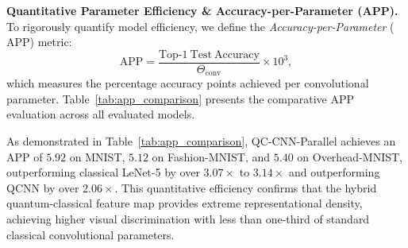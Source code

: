 \documentclass[pdflatex,sn-mathphys-num]{sn-jnl}%
\theoremstyle{thmstyleone}%
\theoremstyle{thmstyletwo}%
\theoremstyle{thmstylethree}%
\begin{document}
\textbf{Quantitative Parameter Efficiency \& Accuracy-per-Parameter (APP).} 
To rigorously quantify model efficiency, we define the \textit{Accuracy-per-Parameter} ($\mathrm{APP}$) metric:
\begin{equation}
\mathrm{APP} = \frac{\mathrm{Top\text{-}1\ Test\ Accuracy}}{\Theta_{\mathrm{conv}}} \times 10^3,
\label{eq:accuracy_per_parameter}
\end{equation}
which measures the percentage accuracy points achieved per convolutional parameter. Table~\ref{tab:app_comparison} presents the comparative APP evaluation across all evaluated models.

\begin{table}[htbp]
\centering
\caption{Accuracy-per-Parameter ($\mathrm{APP}$) Efficiency Metric Across Datasets ($\times 10^3$)}
\label{tab:app_comparison}
\renewcommand{\arraystretch}{1.1}
\end{table}

As demonstrated in Table~\ref{tab:app_comparison}, QC-CNN-Parallel achieves an APP of $5.92$ on MNIST, $5.12$ on Fashion-MNIST, and $5.40$ on Overhead-MNIST, outperforming classical LeNet-5 by over $\mathbf{3.07\times}$ to $\mathbf{3.14\times}$ and outperforming QCNN by over $\mathbf{2.06\times}$. This quantitative efficiency confirms that the hybrid quantum-classical feature map provides extreme representational density, achieving higher visual discrimination with less than one-third of standard classical convolutional parameters.
\end{document}

